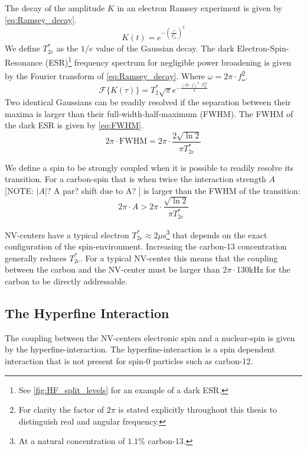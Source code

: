 The decay of the amplitude $K$ in an electron Ramsey experiment is given by \cref{eq:Ramsey_decay}.
\begin{equation}
    K(t) = e^{-(\tfrac{\tau}{T_{2e}^*})^2}
    \label{eq:Ramsey_decay}
\end{equation}
We define $T_{2e}^*$ as the $1/e$ value of the Gaussian decay. The dark Electron-Spin-Resonance (ESR)\footnote{See \cref{fig:HF_split_levels} for an example of a dark ESR.} frequency spectrum for negligible power broadening is given by the Fourier transform of \cref{eq:Ramsey_decay}. Where $\omega = 2\pi \cdot f$\footnote{For clarity the factor of $2\pi$ is stated explicitly throughout this thesis to distinguish real and angular frequency. }.
\begin{equation}
    \mathcal{F} \{ K(\tau) \} =  T_2^* \sqrt{\pi} e^{-\tfrac{(2\pi \cdot f) ^2 \cdot T_{2e}^{*2}}{ 4}}
\end{equation}
Two identical Gaussians can be readily resolved if the separation between their maxima is larger than their full-width-half-maximum (FWHM).
The FWHM of the dark ESR is given by \cref{eq:FWHM}.
\begin{equation}
    2\pi \cdot \mathrm{FWHM} = 2\pi \cdot \frac{2\sqrt{\ln{2}}}{\pi T_{2e}^*}
    \label{eq:FWHM}
\end{equation}

We define a spin to be strongly coupled when it is possible to readily resolve its transition.
For a carbon-spin that is when twice the interaction strength $A$ [NOTE: $|A|$? A par? shift due to A? ] is larger than the FWHM of the transition:
\begin{equation}
     2\pi \cdot A> 2\pi \cdot \frac{\sqrt{\ln{2}}}{\pi T_{2e}^*}
     \label{eq:def_strongly_coupled}
 \end{equation}

NV-centers have a typical electron $T_{2e}^* \approx 2\mu \mathrm{s}$\footnote{At a natural concentration of $1.1 \%$ carbon-13.} that depends on the exact configuration of the spin-environment. Increasing the carbon-13 concentration generally reduces $T_{2e}^*$.
For a typical NV-center this means that the coupling between the carbon and the NV-center must be larger than $2\pi\cdot$130kHz for the carbon to be directly addressable.


\subsection{The Hyperfine Interaction}
The coupling between the NV-centers electronic spin and a nuclear-spin is given by the hyperfine-interaction. The hyperfine-interaction is a spin dependent interaction that is not present for spin-0 particles such as carbon-12.

